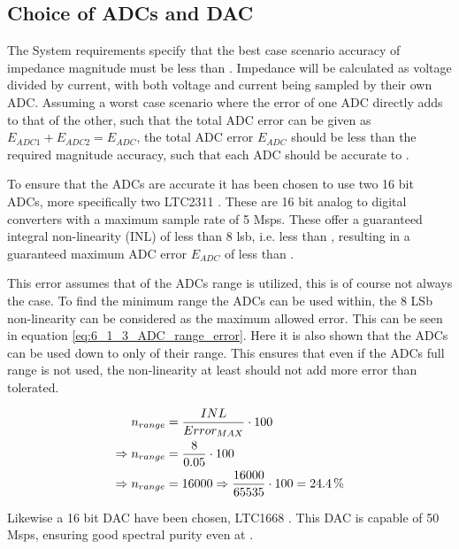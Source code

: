 \subsection{Choice of ADCs and DAC} \label{subsec:ADC_DAC_Choice}
The System requirements specify that the best case scenario accuracy of impedance magnitude must be less than . Impedance will be calculated as voltage divided by current, with both voltage and current being sampled by their own ADC. Assuming a worst case scenario where the error of one ADC directly adds to that of the other, such that the total ADC error can be given as $E_{ADC1}+E_{ADC2} = E_{ADC}$, the total ADC error $E_{ADC}$ should be less than the required magnitude accuracy, such that each ADC should be accurate to .

To ensure that the ADCs are accurate it has been chosen to use two 16 bit ADCs, more specifically two LTC2311 \cite{ADC_LTC2311}. These are 16 bit analog to digital converters with a maximum sample rate of 5 Msps. These offer a guaranteed integral non-linearity (INL) of less than 8 lsb, i.e. less than , resulting in a guaranteed maximum ADC error $E_{ADC}$ of less than .

This error assumes that  of the ADCs range is utilized, this is of course not always the case. To find the minimum range the ADCs can be used within, the 8 LSb non-linearity can be considered as the maximum allowed  error. This can be seen in equation \ref{eq:6_1_3_ADC_range_error}. Here it is also shown that the ADCs can be used down to only  of their range. This ensures that even if the ADCs full range is not used, the non-linearity at least should not add more error than tolerated.

\begin{equation}
\begin{split}
    \label{eq:6_1_3_ADC_range_error}
    n_{range} &= \frac{INL}{Error_{MAX}} \cdot 100 \\
    \Rightarrow n_{range} &= \frac{8}{0.05} \cdot 100 \\
    \Rightarrow n_{range} & = 16000 \Rightarrow \frac{16000}{65535}\cdot 100 = \SI{24.4}{\%}
\end{split}
\end{equation}

Likewise a 16 bit DAC have been chosen, LTC1668 \cite{DAC_LTC1668}. This DAC is capable of 50 Msps, ensuring good spectral purity even at .